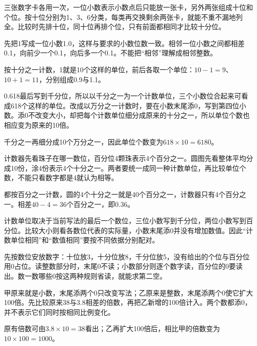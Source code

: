\documentclass[multi=snippet,border=0pt]{standalone}
\newenvironment{snippet}[3]{\begin{minipage}{#1bp}\color{answerred}\fontsize{#2}{#3}\selectfont\raggedright}{\end{minipage}}
\begin{document}
\begin{snippet}{505}{11.5}{14}三张数字卡各用一次，一位小数表示小数点后只能放一张卡，另外两张组成十位和个位。按十位分别为1、3、6分类，每类再交换剩余两张卡，就能不重不漏地列全。比较时先排十位，同十位再排个位，只有前面都相同才比较十分位。\end{snippet}
\begin{snippet}{505}{11.5}{14}先把1写成一位小数1.0，这样与要求的小数位数一致。相邻一位小数之间都相差0.1，向前少一个0.1，向后多一个0.1。不能把“相邻”理解成相邻整数。\par 按十分之一计数，1就是10个这样的单位，前后各取一个单位：\(10-1=9\)、\(10+1=11\)，分别组成0.9与1.1。\end{snippet}
\begin{snippet}{505}{11.5}{14}0.618最后写到千分位，所以以千分之一为一个计数单位，三个小数位合起来可看成618个这样的单位。改成以万分之一计数时，要在小数末尾添0，写到第四位小数。添0不改变大小，却把每个计数单位细分成原来的十分之一，所以单位个数也相应变为原来的10倍。\par 千分之一再细分成10个万分之一，因此单位个数变为\(618\times10=6180\)。\end{snippet}
\begin{snippet}{505}{11.5}{14}计数器先看珠子在哪一数位，百分位4颗珠表示4个百分之一。圆图先看整体平均分成10份，涂4份表示4个十分之一。两者要统一成同一种计数单位，再比较单位个数，不能只看数字都是4就认为相等。\par 都按百分之一计数，圆的4个十分之一就是40个百分之一，计数器只有4个百分之一。相差\(40-4=36\)个百分之一，即0.36。\end{snippet}
\begin{snippet}{505}{11.5}{14}计数单位取决于当前写法的最后一个数位，三位小数写到千分位，两位小数写到百分位。比较大小则看各数位代表的实际量，小数末尾添0并没有增加数值。因此“计数单位相同”和“数值相同”要按不同依据分别配对。\end{snippet}
\begin{snippet}{505}{11.5}{14}先按数位安放数字：十位放3，十分位放8，千分位放5，没有给出的个位与百分位用0占位。读整数部分时，末尾0不读；小数部分则逐个数字读，百分位的0要读出。数一数哪些0按这两种规则省读，就能求第二空。\end{snippet}
\begin{snippet}{505}{11.5}{14}甲原来就是小数，末尾添两个0只改变写法；乙原来是整数，末尾添两个0使它扩大100倍。先比较原来38与3.8相差的倍数，再把乙新增的100倍计入。两个数都添0，并不表示它们同时按相同比例变化。\par 原有倍数可由\(3.8\times10=38\)看出；乙再扩大100倍后，相比甲的倍数变为\(10\times100=1000\)。\end{snippet}
\end{document}
